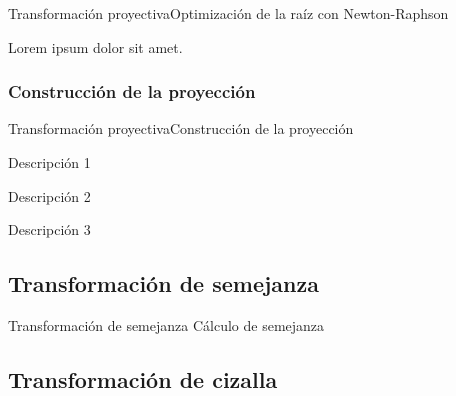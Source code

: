\documentclass[aspectratio=169,14pt,spanish]{beamer}
\begin{document}
        \begin{frame}{Transformación proyectiva}{Optimización de la raíz con Newton-Raphson}
            \begin{overlayarea}{\textwidth}{3cm}
                 {Lorem ipsum dolor sit amet.}
            \end{overlayarea}
        \end{frame}
        \subsubsection{Construcción de la proyección}

          \begin{frame}{Transformación proyectiva}{Construcción de la proyección}

              \begin{description}[<+->]
                  \item [Primer ítem] Descripción 1
                  \item [Segundo ítem] Descripción 2
                  \item [Tercer ítem] Descripción 3
              \end{description}
          \end{frame}
      \subsection{Transformación de semejanza}

        \begin{frame}{Transformación de semejanza}
          Cálculo de semejanza

        \end{frame}

      \subsection{Transformación de cizalla}
\end{document}
